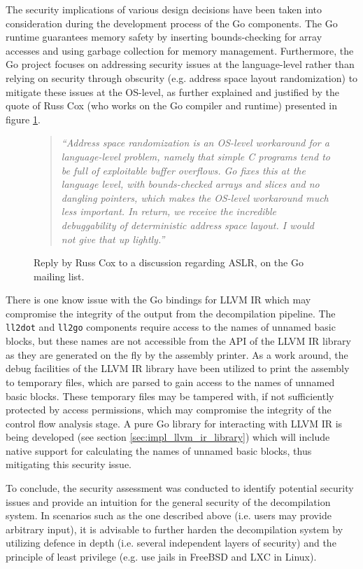 The security implications of various design decisions have been taken into consideration during the development process of the Go components. The Go runtime guarantees memory safety by inserting bounds-checking for array accesses and using garbage collection for memory management. Furthermore, the Go project focuses on addressing security issues at the language-level rather than relying on security through obscurity (e.g. address space layout randomization) to mitigate these issues at the OS-level, as further explained and justified by the quote of Russ Cox (who works on the Go compiler and runtime) presented in figure \ref{fig:no_aslr}.

\begin{figure}[htbp]
	\begin{quote}
		\textit{``Address space randomization is an OS-level workaround for a language-level problem, namely that simple C programs tend to be full of exploitable buffer overflows. Go fixes this at the language level, with bounds-checked arrays and slices and no dangling pointers, which makes the OS-level workaround much less important. In return, we receive the incredible debuggability of deterministic address space layout. I would not give that up lightly.''}
	\end{quote}
	\caption{Reply by Russ Cox to a discussion regarding ASLR, on the Go mailing list\protect\footnotemark.}
	\label{fig:no_aslr}
\end{figure}

There is one know issue with the Go bindings for LLVM IR which may compromise the integrity of the output from the decompilation pipeline. The \texttt{ll2dot} and \texttt{ll2go} components require access to the names of unnamed basic blocks, but these names are not accessible from the API of the LLVM IR library as they are generated on the fly by the assembly printer. As a work around, the debug facilities of the LLVM IR library have been utilized to print the assembly to temporary files, which are parsed to gain access to the names of unnamed basic blocks. These temporary files may be tampered with, if not sufficiently protected by access permissions, which may compromise the integrity of the control flow analysis stage. A pure Go library for interacting with LLVM IR is being developed (see section \ref{sec:impl_llvm_ir_library}) which will include native support for calculating the names of unnamed basic blocks, thus mitigating this security issue.

To conclude, the security assessment was conducted to identify potential security issues and provide an intuition for the general security of the decompilation system. In scenarios such as the one described above (i.e. users may provide arbitrary input), it is advisable to further harden the decompilation system by utilizing defence in depth (i.e. several independent layers of security) and the principle of least privilege (e.g. use jails in FreeBSD and LXC in Linux).
